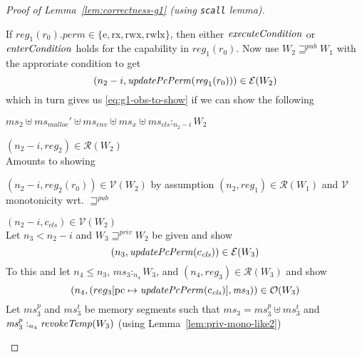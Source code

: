 \documentclass[a4paper]{article}
\newcommand{\update}[2]{[#1 \mapsto #2]}
\newcommand{\var}[1]{\mathit{#1}}
\newcommand{\hs}{\var{ms}}
\newcommand{\ms}{\hs}
\newcommand{\pcreg}{\mathrm{pc}}
\newcommand{\reg}{\var{reg}}
\newcommand{\heap}{\var{mem}}
\newcommand{\perm}{\var{perm}}
\newcommand{\env}{\var{env}}
\newcommand{\cls}{\var{cls}}
\newcommand{\plainfun}[2]{
  \ifthenelse{\equal{#2}{}}
  {\mathit{#1}}
  {\mathit{#1}(#2)}
}
\newcommand{\updatePcPerm}[1]{\plainfun{updatePcPerm}{#1}}
\newcommand{\execCond}[1]{\plainfun{executeCondition}{#1}}
\newcommand{\entryCond}[1]{\plainfun{enterCondition}{#1}}
\newcommand{\revokeTemp}[1]{\plainfun{revokeTemp}{#1}}
\newcommand{\futurewk}{\mathbin{\sqsupseteq}^{\var{pub}}}
\newcommand{\futurestr}{\mathbin{\sqsupseteq}^{\var{priv}}}
\newcommand{\heapSat}[3][\heap]{#1 :_{#2} #3}
\newcommand{\memSat}[3][n]{\heapSat[#2]{#1}{#3}}
\newcommand{\codelabel}[1]{\mathit{#1}}
\newcommand{\malloc}{\codelabel{malloc}}
\newcommand{\asmType}{\plaindom{AsmType}}
\newcommand{\plaindom}[1]{\mathrm{#1}}
\newcommand{\intr}[2]{\mathcal{#1}}
\newcommand{\valueintr}[1]{\intr{V}{#1}}
\newcommand{\exprintr}[1]{\intr{E}{#1}}
\newcommand{\regintr}[1]{\intr{R}{#1}}
\newcommand{\stdvr}{\valueintr{\asmType}}
\newcommand{\stder}{\exprintr{\asmType}}
\newcommand{\stdrr}{\regintr{\asmType}}
\newcommand{\observations}{\mathcal{O}}
\newcommand{\npair}[2][n]{\left(#1,#2 \right)}
\newcommand{\plainperm}[1]{\mathrm{#1}}
\newcommand{\exec}{\plainperm{rx}}
\newcommand{\entry}{\plainperm{e}}
\newcommand{\rwx}{\plainperm{rwx}}
\newcommand{\rwlx}{\plainperm{rwlx}}
\begin{document}
\begin{proof}[Proof of Lemma~\ref{lem:correctness-g1} (using \texttt{scall} lemma)]
\begin{enumproof}[resume]
\begin{enumproof}
          If $\reg_1(r_0).\perm \in \{\entry, \exec, \rwx, \rwlx\}$, then either $\execCond{}$ or $\entryCond{}$ holds for the capability in $\reg_1(r_0)$. Now use $W_2 \futurewk W_1$ with the approriate condition to get 
          \[
            \npair[n_2-i]{\updatePcPerm{\reg_1(r_0)}} \in \stder(W_2)
          \]
          which in turn gives us \ref{eq:g1-obs-to-show} if we can show the following
          \begin{enumproof}
            \item $\memSat[n_2-i]{\ms_2 \uplus \ms_\malloc' \uplus \ms_\env \uplus \ms_x \uplus \ms_\cls}{W_2}$
            \item $\npair[n_2-i]{\reg_2} \in \stdrr(W_2)$ \\
              Amounts to showing
              \begin{enumproof}
                \item $\npair[n_2-i]{\reg_2(r_0)} \in \stdvr(W_2)$ by assumption $\npair[n_2]{\reg_1} \in \stdrr(W_1)$ and $\stdvr$ monotonicity wrt. $\futurewk$
                \item $\npair[n_2-i]{c_\cls} \in \stdvr(W_2)$ \\
                  Let $n_3 < n_2 - i$ and $W_3 \futurestr W_2$ be given and show
                  \[
                    \npair[n_3]{\updatePcPerm{c_\cls}} \in \stder(W_3)
                  \]
                  To this and let $n_4 \leq n_3$, $\memSat[n_4]{\ms_3}{W_3}$, and $\npair[n_4]{\reg_3} \in \stdrr(W_3)$ and show
                  \begin{equation}
                    \label{eq:g1-c-cls-obs}
                    \npair[n_4]{(reg_3\update{\pcreg}{\updatePcPerm{c_\cls}},\ms_3)} \in \observations(W_3)
                  \end{equation}
                  Let $\ms_3^p$ and $\ms_3^t$ be memory segments such that $\ms_3 = \ms_3^p \uplus \ms_3^t$ and $\memSat[n_4]{\ms_3^p}{\revokeTemp{W_3}}$ (using Lemma~\ref{lem:priv-mono-like2})


\end{enumproof}
\end{enumproof}
\end{enumproof}
\end{enumproof}
\end{proof}
\end{document}
